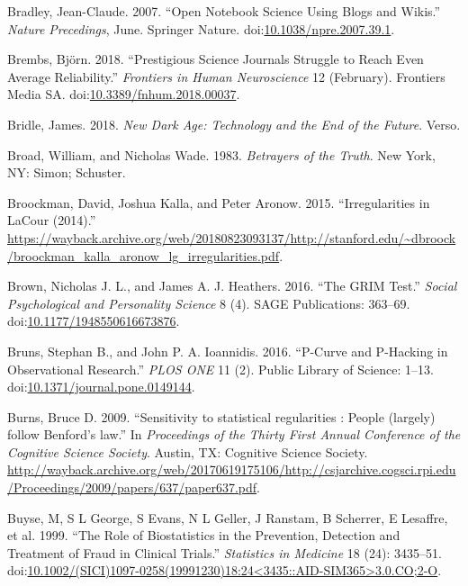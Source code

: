 \documentclass[a5paper]{book}
\begin{document}
\hypertarget{ref-doi:10.1038ux2fnpre.2007.39.1}{}
Bradley, Jean-Claude. 2007. ``Open Notebook Science Using Blogs and
Wikis.'' \emph{Nature Precedings}, June. Springer Nature.
doi:\href{https://doi.org/10.1038/npre.2007.39.1}{10.1038/npre.2007.39.1}.

\hypertarget{ref-doi:10.3389ux2ffnhum.2018.00037}{}
Brembs, Björn. 2018. ``Prestigious Science Journals Struggle to Reach
Even Average Reliability.'' \emph{Frontiers in Human Neuroscience} 12
(February). Frontiers Media SA.
doi:\href{https://doi.org/10.3389/fnhum.2018.00037}{10.3389/fnhum.2018.00037}.

\hypertarget{ref-isbn:9781786635471}{}
Bridle, James. 2018. \emph{New Dark Age: Technology and the End of the
Future}. Verso.

\hypertarget{ref-isbn:9780671447694}{}
Broad, William, and Nicholas Wade. 1983. \emph{Betrayers of the Truth}.
New York, NY: Simon; Schuster.

\hypertarget{ref-lg-irreg}{}
Broockman, David, Joshua Kalla, and Peter Aronow. 2015. ``Irregularities
in LaCour (2014).''
\url{https://wayback.archive.org/web/20180823093137/http://stanford.edu/~dbroock/broockman_kalla_aronow_lg_irregularities.pdf}.

\hypertarget{ref-doi:10.1177ux2f1948550616673876}{}
Brown, Nicholas J. L., and James A. J. Heathers. 2016. ``The GRIM
Test.'' \emph{Social Psychological and Personality Science} 8 (4). SAGE
Publications: 363--69.
doi:\href{https://doi.org/10.1177/1948550616673876}{10.1177/1948550616673876}.

\hypertarget{ref-doi:10.1371ux2fjournal.pone.0149144}{}
Bruns, Stephan B., and John P. A. Ioannidis. 2016. ``P-Curve and
P-Hacking in Observational Research.'' \emph{PLOS ONE} 11 (2). Public
Library of Science: 1--13.
doi:\href{https://doi.org/10.1371/journal.pone.0149144}{10.1371/journal.pone.0149144}.

\hypertarget{ref-Burns2009}{}
Burns, Bruce D. 2009. ``Sensitivity to statistical regularities : People
(largely) follow Benford's law.'' In \emph{Proceedings of the Thirty
First Annual Conference of the Cognitive Science Society}. Austin, TX:
Cognitive Science Society.
\url{http://wayback.archive.org/web/20170619175106/http://csjarchive.cogsci.rpi.edu/Proceedings/2009/papers/637/paper637.pdf}.

\hypertarget{ref-buyse1999}{}
Buyse, M, S L George, S Evans, N L Geller, J Ranstam, B Scherrer, E
Lesaffre, et al. 1999. ``The Role of Biostatistics in the Prevention,
Detection and Treatment of Fraud in Clinical Trials.'' \emph{Statistics
in Medicine} 18 (24): 3435--51.
doi:\href{https://doi.org/10.1002/(SICI)1097-0258(19991230)18:24\%3C3435::AID-SIM365\%3E3.0.CO;2-O}{10.1002/(SICI)1097-0258(19991230)18:24\textless{}3435::AID-SIM365\textgreater{}3.0.CO;2-O}.
\end{document}

